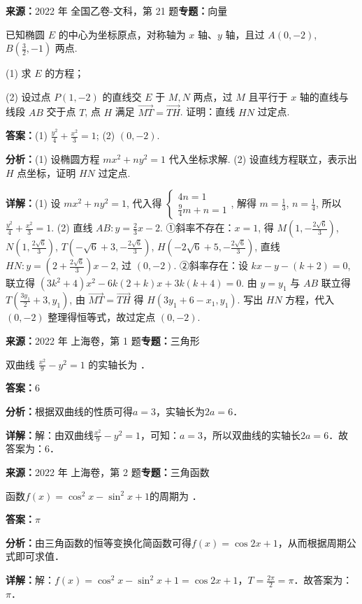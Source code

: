 \begin{question}[points=12]
\textbf{来源：}2022 年 全国乙卷-文科，第 21 题\quad \textbf{专题：}向量\par
已知椭圆 $E$ 的中心为坐标原点，对称轴为 $x$ 轴、$y$ 轴，且过 $A(0,-2)$, $B(\frac32,-1)$ 两点.

(1) 求 $E$ 的方程；

(2) 设过点 $P(1,-2)$ 的直线交 $E$ 于 $M,N$ 两点，过 $M$ 且平行于 $x$ 轴的直线与线段 $AB$ 交于点 $T$, 点 $H$ 满足 $\overrightarrow{MT} = \overrightarrow{TH}$. 证明：直线 $HN$ 过定点.
\begin{solution}
\textbf{答案：}(1) $\frac{y^2}{4}+\frac{x^2}{3}=1$; (2) $(0,-2)$.

\textbf{分析：}(1) 设椭圆方程 $mx^2+ny^2=1$ 代入坐标求解.
(2) 设直线方程联立，表示出 $H$ 点坐标，证明 $HN$ 过定点.

\textbf{详解：}(1) 设 $mx^2+ny^2=1$, 代入得 $\begin{cases} 4n=1 \\ \frac94 m + n = 1 \end{cases}$, 解得 $m=\frac13$, $n=\frac14$, 所以 $\frac{y^2}{4}+\frac{x^2}{3}=1$.
(2) 直线 $AB: y=\frac23 x -2$. ①斜率不存在：$x=1$, 得 $M(1,-\frac{2\sqrt6}{3})$, $N(1,\frac{2\sqrt6}{3})$, $T(-\sqrt6+3,-\frac{2\sqrt6}{3})$, $H(-2\sqrt6+5,-\frac{2\sqrt6}{3})$, 直线 $HN: y=(2+\frac{2\sqrt6}{3})x-2$, 过 $(0,-2)$. ②斜率存在：设 $kx-y-(k+2)=0$, 联立得 $(3k^2+4)x^2-6k(2+k)x+3k(k+4)=0$. 由 $y=y_1$ 与 $AB$ 联立得 $T(\frac{3y_1}{2}+3, y_1)$, 由 $\overrightarrow{MT}=\overrightarrow{TH}$ 得 $H(3y_1+6-x_1, y_1)$. 写出 $HN$ 方程，代入 $(0,-2)$ 整理得恒等式，故过定点 $(0,-2)$.
\end{solution}
\end{question}

\begin{question}[points=4]
\textbf{来源：}2022 年 上海卷，第 1 题\quad \textbf{专题：}三角形\par
双曲线 $\frac{x^2}{9} - y^2 = 1$ 的实轴长为 ．
\fillin[{$6$}]
\begin{solution}
\textbf{答案：}$6$

\textbf{分析：}根据双曲线的性质可得$a=3$，实轴长为$2a=6$．

\textbf{详解：}解：由双曲线$\frac{x^2}{9} - y^2 = 1$，可知：$a=3$，所以双曲线的实轴长$2a=6$．故答案为：$6$．
\end{solution}
\end{question}

\begin{question}[points=4]
\textbf{来源：}2022 年 上海卷，第 2 题\quad \textbf{专题：}三角函数\par
函数$f(x) = \cos^2 x - \sin^2 x + 1$的周期为 ．
\fillin[{$\pi$}]
\begin{solution}
\textbf{答案：}$\pi$

\textbf{分析：}由三角函数的恒等变换化简函数可得$f(x)=\cos 2x+1$，从而根据周期公式即可求值．

\textbf{详解：}解：$f(x)=\cos^2 x - \sin^2 x + 1 = \cos 2x + 1$，$T=\frac{2\pi}{2}=\pi$．故答案为：$\pi$．
\end{solution}
\end{question}

